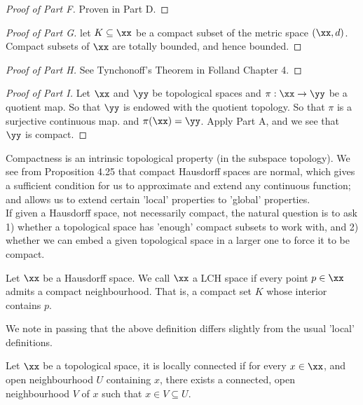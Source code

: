 \documentclass[../main-v2-manifolds.tex]{subfiles}
\begin{document}
\begin{proof}[Proof of  Part F]
    Proven in Part D.
\end{proof}
    
\begin{proof}[Proof of  Part G]
    let $K\subseteq \xx$ be a compact subset of the metric space $(\xx,d)$. Compact subsets of $\xx$ are totally bounded, and hence bounded.
\end{proof}

\begin{proof}[Proof of  Part H]
    See Tynchonoff's Theorem in Folland Chapter 4.
\end{proof}

\begin{proof}[Proof of  Part I]
    Let $\xx$ and $\yy$ be topological spaces and $\pi: \xx\to\yy$ be a quotient map. So that $\yy$ is endowed with the quotient topology. So that $\pi$ is a surjective continuous map. and $\pi(\xx)=\yy$. Apply Part A, and we see that $\yy$ is compact.
\end{proof}



Compactness is an intrinsic topological property (in the subspace topology). We see from Proposition 4.25 that compact Hausdorff spaces are normal, which gives a sufficient condition for us to approximate and extend any continuous function; and allows us to extend certain 'local' properties to 'global' properties. \\

If given a Hausdorff space, not necessarily compact, the natural question is to ask 1) whether a topological space has 'enough' compact subsets to work with, and 2) whether we can embed a given topological space in a larger one to force it to be compact.

\begin{definition}\label{chp4:LCH-definition}
    Let $\xx$ be a Hausdorff space. We call $\xx$ a LCH space if every point $p\in\xx$ admits a compact neighbourhood. That is, a compact set $K$ whose interior contains $p$.
\end{definition} 

We note in passing that the above definition differs slightly from the usual 'local' definitions.

\begin{definition}\label{chp4:locally-connected-definition}
    Let $\xx$ be a topological space, it is locally connected if for every $x\in\xx$, and open neighbourhood $U$ containing $x$, there exists a connected, open neighbourhood $V$ of $x$ such that $x\in V\subseteq U$.
\end{definition}
\end{document}
